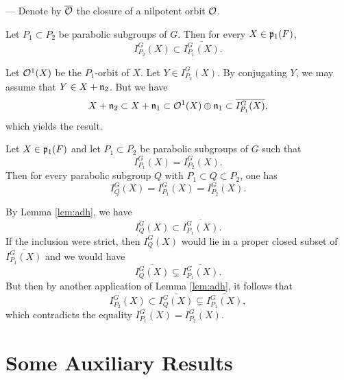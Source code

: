 \begin{paragr} --- Denote by $\overline{\mathcal{O}}$ the closure of a nilpotent orbit $\mathcal{O}$.
  
\begin{lemme}\label{lem:adh}
Let $P_1\subset P_2$ be parabolic subgroups of $G$. Then for every $X\in \mathfrak{p}_1(F)$,
$$I_{P_2}^G(X)\subset \overline{I_{P_1}^G(X)}.$$    
\end{lemme}
  
\begin{preuve}
Let $\mathcal{O}^{1}(X)$ be the $P_1$-orbit of $X$. Let $Y\in I_{P_2}^G(X)$. By conjugating $Y$, we may assume that $Y\in X+\mathfrak{n}_2$. But we have 
$$X+\mathfrak{n}_2 \subset X+\mathfrak{n}_1 \subset \mathcal{O}^{1}(X)\oplus \mathfrak{n}_1 \subset  \overline{I_{P_1}^G(X)},$$
which yields the result.
\end{preuve}

\begin{lemme}
Let $X\in \mathfrak{p}_1(F)$ and let $P_1\subset P_2$ be parabolic subgroups of $G$ such that
$$I_{P_1}^G(X)=I_{P_2}^G(X).$$ 
Then for every parabolic subgroup $Q$ with $P_1\subset Q\subset P_2$, one has 
$$I_Q^G(X)=I_{P_1}^G(X)=I_{P_2}^G(X).$$
\end{lemme}

\begin{preuve}
By Lemma \ref{lem:adh}, we have 
$$I_Q^G(X)\subset \overline{I_{P_1}^G(X)}.$$
If the inclusion were strict, then $I_Q^G(X)$ would lie in a proper closed subset of $\overline{I_{P_1}^G(X)}$ and we would have 
$$\overline{I_Q^G(X)}\subsetneq \overline{I_{P_1}^G(X)}.$$
But then by another application of Lemma \ref{lem:adh}, it follows that 
$$I_{P_2}^G(X)\subset \overline{I_Q^G(X)}\subsetneq \overline{I_{P_1}^G(X)},$$
which contradicts the equality $I_{P_1}^G(X)=I_{P_2}^G(X)$.
\end{preuve}
\end{paragr}



\section{Some Auxiliary Results}\label{sec:aux}

